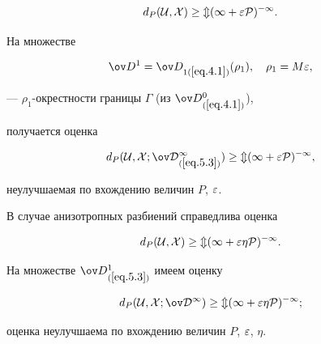 \begin{equation}


\label{eq.5.2}


d_P(\cu,X)\geq m(1+\eps P)^{-1}.


\end{equation}


На множестве


\begin{equation}\label{eq.5.3}


\od{}^1=\od_{1(\ref{eq.4.1})}(\rho_1),\quad \rho_1=M\eps,


\end{equation}


--- $\rho_1$-окрестности границы $\varGamma$ (из $\od{}^0_{(\ref{eq.4.1})}$),


получается оценка


\begin{equation}\label{eq.5.4}


d_P(\cu,X;\od{}^1_{(\ref{eq.5.3})})\geq m(1+\eps P)^{-1},


\end{equation}


неулучшаемая по вхождению величин $P$, $\varepsilon$.





В случае анизотропных разбиений справедлива оценка


\begin{equation}\label{eq.5.5}


d_P(\cu,X)\geq m(1+\eps\eta P)^{-1}.


\end{equation}


На множестве $\od{}^1_{(\ref{eq.5.3})}$ имеем оценку


\begin{equation}\label{eq.5.6}


d_P(\cu,X;\od{}^1)\geq m(1+\eps\eta P)^{-1};


\end{equation}


оценка неулучшаема по вхождению величин $P$, $\varepsilon$, $\eta$.





